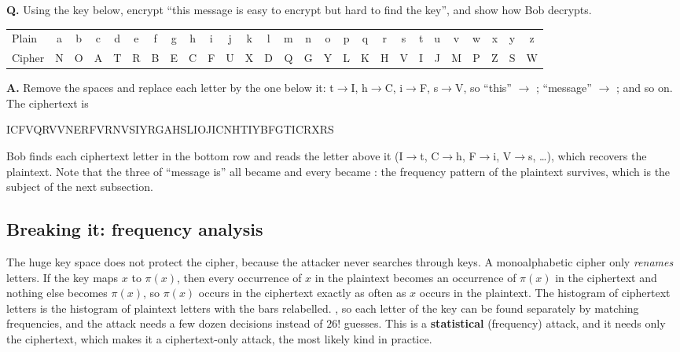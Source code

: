 \begin{worked}
\textbf{Q.} Using the key below, encrypt ``this message is easy to encrypt but hard to find the key'', and show how Bob decrypts.
\begin{center}\small\setlength{\tabcolsep}{2.4pt}
\begin{tabular}{@{}l*{26}{c}@{}}
\toprule
Plain & a&b&c&d&e&f&g&h&i&j&k&l&m&n&o&p&q&r&s&t&u&v&w&x&y&z\\
Cipher & N&O&A&T&R&B&E&C&F&U&X&D&Q&G&Y&L&K&H&V&I&J&M&P&Z&S&W\\
\bottomrule
\end{tabular}
\end{center}
\textbf{A.} Remove the spaces and replace each letter by the one below it: t$\to$I, h$\to$C, i$\to$F, s$\to$V, so ``this'' $\to$ ; ``message'' $\to$ ; and so on. The ciphertext is
\begin{center}\small\ttfamily ICFVQRVVNERFVRNVSIYRGAHSLIOJICNHTIYBFGTICRXRS\end{center}
Bob finds each ciphertext letter in the bottom row and reads the letter above it (I$\to$t, C$\to$h, F$\to$i, V$\to$s, \dots), which recovers the plaintext. Note that the three  of ``message is'' all became  and every  became : the frequency pattern of the plaintext survives, which is the subject of the next subsection.
\end{worked}

\subsection{Breaking it: frequency analysis}
The huge key space does not protect the cipher, because the attacker never searches through keys. A monoalphabetic cipher only \emph{renames} letters. If the key maps $x$ to $\pi(x)$, then every occurrence of $x$ in the plaintext becomes an occurrence of $\pi(x)$ in the ciphertext and nothing else becomes $\pi(x)$, so $\pi(x)$ occurs in the ciphertext exactly as often as $x$ occurs in the plaintext. The histogram of ciphertext letters is the histogram of plaintext letters with the bars relabelled. , so each letter of the key can be found separately by matching frequencies, and the attack needs a few dozen decisions instead of $26!$ guesses. This is a \textbf{statistical} (frequency) attack, and it needs only the ciphertext, which makes it a ciphertext-only attack, the most likely kind in practice.

